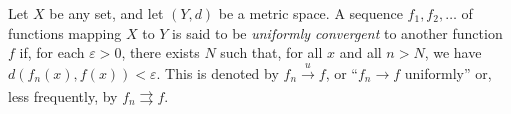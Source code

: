 \documentclass[12pt]{article}
\begin{document}
Let $X$ be any set, and let $(Y,d)$ be a metric space. 
A sequence $f_1,f_2,\dots$ of functions mapping $X$ to $Y$ is said to be 
\emph{uniformly convergent} to another function $f$ if, for each $\varepsilon>0$, there exists $N$ such that, for all $x$ and all $n>N$, we have $d(f_n(x),f(x))<\varepsilon$. 
This is denoted by $f_n\xrightarrow[]{u} f$, or ``$f_n\rightarrow f$ uniformly'' or, less frequently, by $f_n\rightrightarrows f$.
\end{document}
